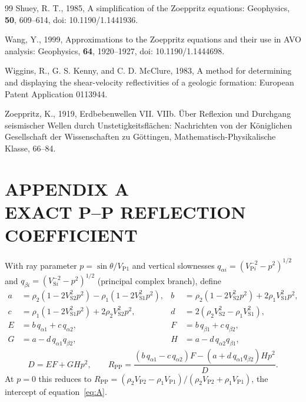 \documentclass[11pt]{article}
\newcommand{\RPP}{R_\mathrm{PP}}
\begin{document}
\begin{thebibliography}{99}
Shuey, R. T., 1985, A simplification of the Zoeppritz equations: Geophysics, \textbf{50}, 609--614, doi: 10.1190/1.1441936.

Wang, Y., 1999, Approximations to the Zoeppritz equations and their use in AVO analysis: Geophysics, \textbf{64}, 1920--1927, doi: 10.1190/1.1444698.

Wiggins, R., G. S. Kenny, and C. D. McClure, 1983, A method for determining and displaying the shear-velocity reflectivities of a geologic formation: European Patent Application 0113944.

Zoeppritz, K., 1919, Erdbebenwellen VII. VIIb. \"Uber Reflexion und Durchgang seismischer Wellen durch Unstetigkeitsfl\"achen: Nachrichten von der K\"oniglichen Gesellschaft der Wissenschaften zu G\"ottingen, Mathematisch-Physikalische Klasse, 66--84.

\end{thebibliography}

\clearpage
\section*{APPENDIX A\\ EXACT P--P REFLECTION COEFFICIENT}
\setcounter{equation}{0}
\renewcommand{\theequation}{A-\arabic{equation}}

With ray parameter $p=\sin\theta/V_{\mathrm{P}1}$ and vertical slownesses $q_{\alpha i}=(V_{\mathrm{P}i}^{-2}-p^2)^{1/2}$ and $q_{\beta i}=(V_{\mathrm{S}i}^{-2}-p^2)^{1/2}$ (principal complex branch), define \citep[][equation 5.39]{aki1980}
\begin{align}
a&=\rho_2(1-2V_{\mathrm{S}2}^2p^2)-\rho_1(1-2V_{\mathrm{S}1}^2p^2), & b&=\rho_2(1-2V_{\mathrm{S}2}^2p^2)+2\rho_1V_{\mathrm{S}1}^2p^2,\\
c&=\rho_1(1-2V_{\mathrm{S}1}^2p^2)+2\rho_2V_{\mathrm{S}2}^2p^2, & d&=2(\rho_2V_{\mathrm{S}2}^2-\rho_1V_{\mathrm{S}1}^2),\\
E&=b\,q_{\alpha1}+c\,q_{\alpha2}, & F&=b\,q_{\beta1}+c\,q_{\beta2},\\
G&=a-d\,q_{\alpha1}q_{\beta2}, & H&=a-d\,q_{\alpha2}q_{\beta1},
\end{align}
\begin{equation}
D=EF+GHp^2,\qquad
\RPP=\frac{(b\,q_{\alpha1}-c\,q_{\alpha2})F-(a+d\,q_{\alpha1}q_{\beta2})Hp^2}{D}.
\end{equation}
At $p=0$ this reduces to $\RPP=(\rho_2V_{\mathrm{P}2}-\rho_1V_{\mathrm{P}1})/(\rho_2V_{\mathrm{P}2}+\rho_1V_{\mathrm{P}1})$, the intercept of equation~\ref{eq:A}.
\end{document}
